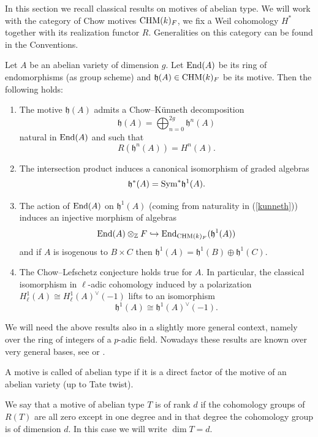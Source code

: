 In this section we recall classical results on motives of abelian type. We will work with the category of Chow motives $\mathrm{CHM}(k)_{F}$, we fix a Weil cohomology $H^*$ together with its realization functor $R$. Generalities on this category   can be found in the  Conventions.
\begin{theorem}
\notready\label{classic} Let $A$ be an abelian variety of dimension  $g$. Let $\textnormal{End}(A)$ be its ring of endomorphisms (as group scheme) and $\mathfrak{h}(A)\in \mathrm{CHM}(k)_{F}$ be its motive. Then the following holds:
\begin{enumerate}
\item\label{kunneth} \cite{DeMu} The motive $\mathfrak{h}(A)$ admits a Chow--K\"unneth decomposition
\[\mathfrak{h}(A)=\bigoplus_{n=0}^{2g} \mathfrak{h}^n(A)\] natural in $\textnormal{End}(A)$ and such that
\[R(\mathfrak{h}^n(A))= H^n(A).\]
\item\label{kunn} \cite{Ku1} The intersection product induces a canonical isomorphism of graded algebras \[\mathfrak{h}^*(A)=\textnormal{Sym}^* \mathfrak{h}^1(A).\]
\item\label{kings}   \cite[Proposition 2.2.1]{Ki}  The action of $\textnormal{End}(A)$ on $\mathfrak{h}^1(A)$ (coming from naturality in (\ref{kunneth}))  induces an injective morphism of algebras  \[\textnormal{End}(A)\otimes_{\mathbb{Z}}F \hookrightarrow \textnormal{End}_{\mathrm{CHM}(k)_{F}}(\mathfrak{h}^1(A))\]
and if $A$ is isogenous to $B\times C$ then $\mathfrak{h}^1(A) =  \mathfrak{h}^1(B) \oplus \mathfrak{h}^1(C) .$
\item\label{polarization}   \cite{Ku2} The Chow--Lefschetz conjecture holds true for $A$. In particular, the classical isomorphism in $\ell$-adic cohomology  induced by a polarization $H_{\ell}^1(A)\cong H_{\ell}^1(A)^{\vee}(-1)$ lifts to an isomorphism
 \[\mathfrak{h}^1(A)\cong\mathfrak{h}^1(A)^{\vee}(-1).\]
\end{enumerate}
\end{theorem}
\begin{remark}
\notready\label{AHP}
We will need the above results also  in a slightly more general context, namely over the ring of integers of a $p$-adic field. Nowadays these results are known over very general bases, see \cite[Theorem 5.1.6]{OS2} or \cite[Theorem 3.3]{AHP}.
\end{remark}
\begin{definition}
\notready\label{defrank}
 A motive is called of abelian type if it  is a  direct factor of the motive of an abelian variety (up to Tate twist).


We say that a motive of abelian type $T$ is  of rank $d$  if the  cohomology groups of $R(T)$ are all zero except in one degree and in that degree the cohomology group is of dimension $d$.  In this case we will write $\dim T = d.$
\end{definition}

